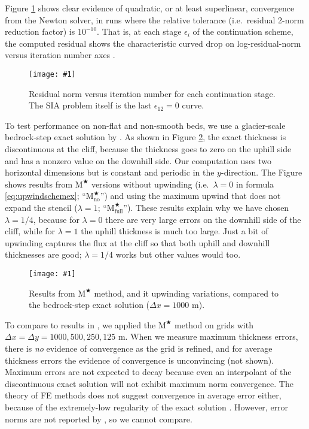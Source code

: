 \documentclass[twocolumn,letterpaper]{igs}
\newcommand{\onecol}[1]{\texttt{[image: \#1]}}
\newcommand\eps{\epsilon}
\newcommand{\Mstar}{$\text{M}^{\bigstar}$\xspace}
\newcommand{\Mstarnoup}{$\text{M}^{\bigstar}_{\text{no}}$\xspace}
\newcommand{\Mstarfullup}{$\text{M}^{\bigstar}_{\text{full}}$\xspace}
\begin{document}
Figure \ref{fig:newtonconv} shows clear evidence of quadratic, or at least superlinear, convergence from the Newton solver, in runs where the relative tolerance (i.e.~residual 2-norm reduction factor) is $10^{-10}$.  That is, at each stage $\eps_i$ of the continuation scheme, the computed residual shows the characteristic curved drop on log-residual-norm versus iteration number axes \citep{Kelley2003}.

\begin{figure}[ht]
\onecol{newtonconv.pdf}
\caption{Residual norm versus iteration number for each continuation stage.  The SIA problem itself is the last $\eps_{12}=0$ curve.}
\label{fig:newtonconv}
\end{figure}

To test performance on non-flat and non-smooth beds, we use a glacier-scale bedrock-step exact solution by \cite{JaroschSchoofAnslow2013}.  As shown in Figure \ref{fig:bedstepprofiles}, the exact thickness is discontinuous at the cliff, because the thickness goes to zero on the uphill side and has a nonzero value on the downhill side.  Our computation uses two horizontal dimensions but is constant and periodic in the $y$-direction.  The Figure shows results from \Mstar versions without upwinding (i.e.~$\lambda=0$ in formula \eqref{eq:upwindschemex}; ``\Mstarnoup'') and using the maximum upwind that does not expand the stencil ($\lambda=1$; ``\Mstarfullup'').  These results explain why we have chosen $\lambda=1/4$, because for $\lambda=0$ there are very large errors on the downhill side of the cliff, while for $\lambda=1$ the uphill thickness is much too large.  Just a bit of upwinding captures the flux at the cliff so that both uphill and downhill thicknesses are good; $\lambda=1/4$ works but other values would too.

\begin{figure}[ht]
\onecol{bedstepprofiles.pdf}
\caption{Results from \Mstar method, and it upwinding variations, compared to the bedrock-step exact solution ($\Delta x=1000$ m).}
\label{fig:bedstepprofiles}
\end{figure}

To compare to results in \citep{JaroschSchoofAnslow2013}, we applied the \Mstar method on grids with $\Delta x=\Delta y = 1000,500,250,125$ m.  When we measure maximum thickness errors, there is \emph{no} evidence of convergence as the grid is refined, and for average thickness errors the evidence of convergence is unconvincing (not shown).  Maximum errors are not expected to decay because even an interpolant of the discontinuous exact solution will not exhibit maximum norm convergence.  The theory of FE methods does not suggest convergence in average error either, because of the extremely-low regularity of the exact solution \citep{Elmanetal2005}.  However, error norms are not reported by \cite{JaroschSchoofAnslow2013}, so we cannot compare.
\end{document}

